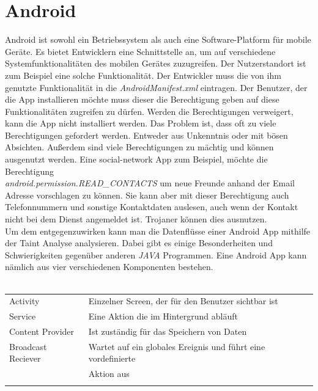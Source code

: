 \documentclass[runningheads]{llncs}
\begin{document}
\section{Android}\label{sec:android}
Android ist sowohl ein Betriebssystem als auch eine Software-Platform für mobile Geräte. Es bietet Entwicklern eine Schnittstelle an, um auf verschiedene Systemfunktionalitäten des mobilen Gerätes zuzugreifen. Der Nutzerstandort ist zum Beispiel eine solche Funktionalität. Der Entwickler muss die von ihm genutzte Funktionalität in die \emph{AndroidManifest.xml} eintragen. Der Benutzer, der die App installieren möchte muss dieser die Berechtigung geben auf diese Funktionalitäten zugreifen zu dürfen. Werden die Berechtigungen verweigert, kann die App nicht installiert werden. Das Problem ist, dass oft zu viele Berechtigungen gefordert werden. Entweder aus Unkenntnis oder mit bösen Absichten. Außerdem sind viele Berechtigungen zu mächtig und können ausgenutzt werden. Eine social-network App zum Beispiel, möchte die Berechtigung\\\emph{android.permission.READ\_CONTACTS} um neue Freunde anhand der Email Adresse vorschlagen zu können. Sie kann aber mit dieser Berechtigung auch Telefonnummern und sonstige Kontaktdaten auslesen, auch wenn der Kontakt nicht bei dem Dienst angemeldet ist. Trojaner können dies ausnutzen. 
\\Um dem entgegenzuwirken kann man die Datenflüsse einer Android App mithilfe der Taint Analyse analysieren. Dabei gibt es einige Besonderheiten und 
\\Schwierigkeiten gegenüber anderen \emph{JAVA} Programmen. Eine Android App kann nämlich aus vier verschiedenen Komponenten bestehen.\\\\
\begin{tabular}{ll}
	Activity & Einzelner Screen, der für den Benutzer sichtbar ist\\
	Service & Eine Aktion die im Hintergrund abläuft\\
	Content Provider & Ist zuständig für das Speichern von Daten\\
	Broadcast Reciever & Wartet auf ein globales Ereignis und führt eine vordefinierte \\
	& Aktion aus\\\\
\end{tabular}
\end{document}

